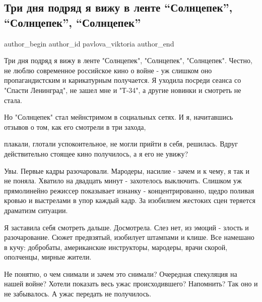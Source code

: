  
 
 
 
 
 
\subsection{Три дня подряд я вижу в ленте \enquote{Солнцепек}, \enquote{Солнцепек}, \enquote{Солнцепек}}
\label{sec:17_08_2021.fb.pavlova_viktoria.1.solncepek}
 
\ifcmt
 author_begin
   author_id pavlova_viktoria
 author_end
\fi

Три дня подряд я вижу в ленте "Солнцепек", "Солнцепек", "Солнцепек". Честно,
не люблю современное российское кино о войне - уж слишком оно пропагандистским
и карикатурным получается. Я уходила посреди сеанса со "Спасти Ленинград", не
зашел мне и "Т-34", а другие новинки и смотреть не стала.

Но "Солнцепек" стал мейнстримом в социальных сетях. И я, начитавшись отзывов о
том, как его смотрели в три захода, 

плакали, глотали успокоительное, не могли прийти в себя, решилась. Вдруг
действительно стоящее кино получилось, а я его не увижу?

Увы. Первые кадры разочаровали. Мародеры, насилие - зачем и к чему, я так и не
поняла. Хватило на двадцать минут - захотелось выключить. Слишком уж
прямолинейно режиссер показывает изнанку - концентрированно, щедро поливая
кровью и выстрелами в упор каждый кадр. За изобилием жестоких сцен теряется
драматизм ситуации.

Я заставила себя смотреть дальше. Досмотрела. Слез нет, из эмоций - злость и
разочарование. Сюжет предвзятый, изобилует штампами и клише. Все намешано в
кучу: добробаты, американские инструкторы, мародеры, врачи скорой, ополченцы,
мирные жители. 

Не понятно, о чем снимали и зачем это снимали? Очередная спекуляция на нашей
войне? Хотели показать весь ужас происходившего? Напомнить? Так оно и не
забывалось. А ужас передать не получилось. 

